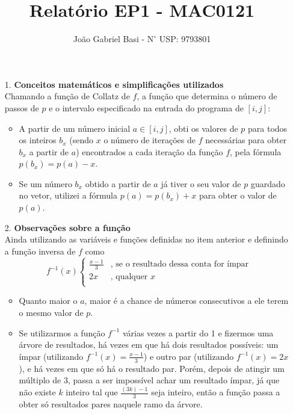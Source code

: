 \documentclass[12pt, a4paper]{article} %
\title{Relatório EP1 - MAC0121}
\date{}
\author{João Gabriel Basi - $\text{N}^\circ$ USP: 9793801}
\begin{document}
\maketitle
\begin{enumerate}
\large
\item[1.]\textbf{Conceitos matemáticos e simplificações utilizados}
\normalsize\\
Chamando a função de Collatz de $f$, a função que determina o número de passos de $p$ e o intervalo especificado na entrada do programa de $[i,j]$:
\begin{itemize}
\item A partir de um número inicial $a\in[i,j]$, obti os valores de $p$ para todos os inteiros $b_x$ (sendo $x$ o número de iterações de $f$ necessárias para obter $b_x$ a partir de $a$) encontrados a cada iteração da função $f$, pela fórmula $p(b_x) = p(a) - x$.
\item Se um número $b_x$ obtido a partir de $a$ já tiver o seu valor de $p$ guardado no vetor, utilizei a fórmula $p(a) = p(b_x) + x$ para obter o valor de $p(a)$.
\end{itemize}
\large
\item[2.]\textbf{Observações sobre a função}
\normalsize\\
Ainda utilizando as variáveis e funções definidas no item anterior e definindo a função inversa de $f$ como
$$f^{-1}(x)\left\{
\begin{array}{ll}
      \frac{x-1}{3} & \text{, se o resultado dessa conta for ímpar}\\
      2x & \text{, qualquer }x\\
\end{array} 
\right.
$$
\begin{itemize}
\item Quanto maior o $a$, maior é a chance de números consecutivos a ele terem o mesmo valor de $p$.
\item Se utilizarmos a função $f^{-1}$ várias vezes a partir do 1 e fizermos uma árvore de resultados, há vezes em que há dois resultados possíveis: um ímpar (utilizando $f^{-1}(x) = \frac{x-1}{3}$) e outro par (utilizando $f^{-1}(x) = 2x$), e há vezes em que só há o resultado par. Porém, depois de atingir um múltiplo de $3$, passa a ser impossível achar um resultado ímpar, já que não existe $k$ inteiro tal que $\frac{(3k)-1}{3}$ seja inteiro, então a função passa a obter só resultados pares naquele ramo da árvore.

\end{itemize}
\end{enumerate}
\end{document}
